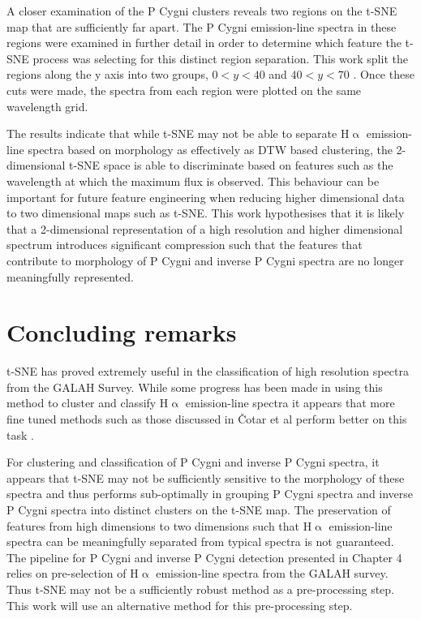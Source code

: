 A closer examination of the P Cygni clusters reveals two regions on the t-SNE map that are sufficiently far apart. The P Cygni emission-line spectra in these regions were examined in further detail in order to determine which feature the t-SNE process was selecting for this distinct region separation. This work split the regions along the y axis into two groups, $0<y<40$ and $40<y<70$ . Once these cuts were made, the spectra from each region were plotted on the same wavelength grid. 

The results indicate that while t-SNE may not be able to separate H$\upalpha$ emission-line spectra based on morphology as effectively as DTW based clustering, the 2-dimensional t-SNE space is able to discriminate based on features such as the wavelength at which the maximum flux is observed. This behaviour can be important for future feature engineering when reducing higher dimensional data to two dimensional maps such as t-SNE. This work hypothesises that it is likely that a 2-dimensional representation of a high resolution and higher dimensional spectrum introduces significant compression such that the features that contribute to morphology of P Cygni and inverse P Cygni spectra are no longer meaningfully represented.

\section{Concluding remarks}

t-SNE has proved extremely useful in the classification of high resolution spectra from the GALAH Survey. While some progress has been made in using this method to cluster and classify H$\upalpha$ emission-line spectra \cite{traven2017galah} it appears that more fine tuned methods such as those discussed in Čotar et al perform better on this task \cite{vcotar2021galah}.

For clustering and classification of P Cygni and inverse P Cygni spectra, it appears that t-SNE may not be sufficiently sensitive to the morphology of these spectra and thus performs sub-optimally in grouping P Cygni spectra and inverse P Cygni spectra into distinct clusters on the t-SNE map. The preservation of features from high dimensions to two dimensions such that H$\upalpha$ emission-line spectra can be meaningfully separated from typical spectra is not guaranteed. The pipeline for P Cygni and inverse P Cygni detection presented in Chapter 4 relies on pre-selection of H$\upalpha$ emission-line spectra from the GALAH survey. Thus t-SNE may not be a sufficiently robust method as a pre-processing step. This work will use an alternative method for this pre-processing step.

